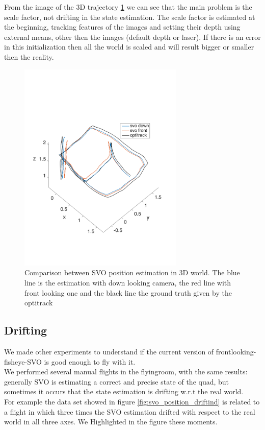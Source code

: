 From the image of the 3D trajectory \ref{fig:comparision_svo_trajectory} we can see that the main problem is the scale factor, not drifting in the state estimation. The scale factor is estimated at the beginning, tracking features of the images and setting their depth using external means, other then the images (default depth or laser). If there is an error in this initialization then all the world is scaled and will result bigger or smaller then the reality.
\begin{figure}[!htbp]
    \centering
    \includegraphics[width=0.7\textwidth]{img/comparision_between_two_svo_and_opti_trajectory.pdf}
    \caption{Comparison between SVO position estimation in 3D world. The blue line is the estimation with down looking camera, the red line with front looking one and the black line the ground truth given by the optitrack}
    \label{fig:comparision_svo_trajectory}
\end{figure}

\subsection{Drifting}
We made other experiments to understand if the current version of frontlooking-fisheye-SVO is good enough to fly with it.\\ 
We performed several manual flights in the flyingroom, with the same results: generally SVO is estimating a correct and precise state of the quad, but sometimes it occurs that the state estimation is drifting w.r.t the real world.\\
For example the data set showed in figure \ref{fig:svo_position_driftind} is related to a flight in which three times the SVO estimation drifted with respect to the real world in all three axes. We Highlighted in the figure these moments.\\

